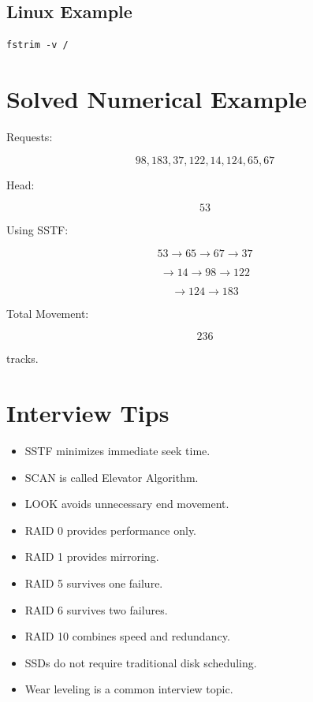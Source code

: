 \subsection{Linux Example}

\begin{verbatim}
fstrim -v /
\end{verbatim}

\section{Solved Numerical Example}

Requests:

\[
98,183,37,122,14,124,65,67
\]

Head:

\[
53
\]

Using SSTF:

\[
53 \rightarrow 65 \rightarrow 67 \rightarrow 37
\]

\[
\rightarrow 14 \rightarrow 98 \rightarrow 122
\]

\[
\rightarrow 124 \rightarrow 183
\]

Total Movement:

\[
236
\]

tracks.

\section{Interview Tips}

\begin{itemize}
\item SSTF minimizes immediate seek time.
\item SCAN is called Elevator Algorithm.
\item LOOK avoids unnecessary end movement.
\item RAID 0 provides performance only.
\item RAID 1 provides mirroring.
\item RAID 5 survives one failure.
\item RAID 6 survives two failures.
\item RAID 10 combines speed and redundancy.
\item SSDs do not require traditional disk scheduling.
\item Wear leveling is a common interview topic.
\end{itemize}


